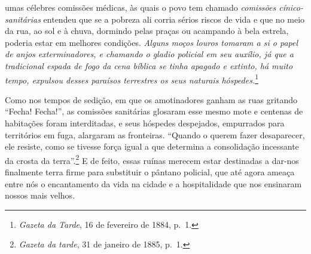umas célebres comissões médicas, às quais o povo tem chamado
\emph{comissões cínico-sanitárias} entendeu que se a pobreza ali corria
sérios riscos de vida e que no meio da rua, ao sol e à chuva, dormindo
pelas praças ou acampando à bela estrela, poderia estar em melhores
condições. \emph{Alguns moços louros tomaram a si o papel de anjos
exterminadores, e chamando o gladio policial em seu auxílio, já que a
tradicional espada de fogo da cena bíblica se tinha apagado e extinto,
há muito tempo, expulsou desses paraísos terrestres os seus naturais
hóspedes.}\footnote{\emph{Gazeta da Tarde}, 16 de fevereiro de 1884,
  p.~1.}

Como nos tempos de sedição, em que os amotinadores ganham as ruas
gritando ``Fecha! Fecha!'', as comissões sanitárias glosaram esse mesmo
mote e centenas de habitações foram interditadas, e seus hóspedes
despejados, empurrados para territórios em fuga, alargaram as
fronteiras. ``Quando o querem fazer desaparecer, ele resiste, como se
tivesse força igual a que determina a consolidação incessante da crosta
da terra''.\footnote{\emph{Gazeta da tarde}, 31 de janeiro de 1885,
  p.~1.} E de feito, essas ruínas merecem estar destinadas a dar-nos
finalmente terra firme para substituir o pântano policial, que até agora
ameaça entre nós o encantamento da vida na cidade e a hospitalidade que
nos ensinaram nossos mais velhos.

